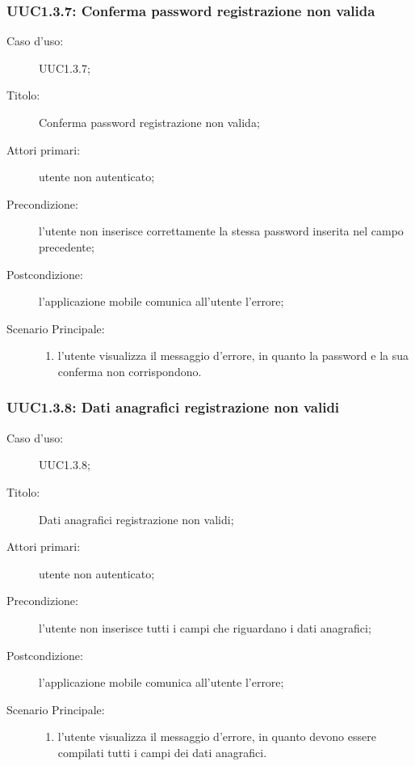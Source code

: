 \documentclass[../../../analisi-dei-requisiti.tex]{subfiles}
\begin{document}
\subsubsection{UUC1.3.7: Conferma password registrazione non valida}%
\label{subs:UUC1.3.7}
\begin{description}
  \item[Caso d'uso:] UUC1.3.7;
  \item[Titolo:] Conferma password registrazione non valida;
  \item[Attori primari:] utente non autenticato;
  \item[Precondizione:] l'utente non inserisce correttamente la stessa password inserita nel campo precedente;
  \item[Postcondizione:] l'applicazione mobile comunica all'utente l'errore;
  \item[Scenario Principale:]
        \begin{enumerate}
          \item l'utente visualizza il messaggio d'errore, in quanto la password e la sua conferma non corrispondono.
        \end{enumerate}
\end{description}

\subsubsection{UUC1.3.8: Dati anagrafici registrazione non validi}%
\label{subs:UUC1.3.8}
\begin{description}
  \item[Caso d'uso:] UUC1.3.8;
  \item[Titolo:] Dati anagrafici registrazione non validi;
  \item[Attori primari:] utente non autenticato;
  \item[Precondizione:] l'utente non inserisce tutti i campi che riguardano i dati anagrafici;
  \item[Postcondizione:] l'applicazione mobile comunica all'utente l'errore;
  \item[Scenario Principale:]
        \begin{enumerate}
          \item l'utente visualizza il messaggio d'errore, in quanto devono essere compilati tutti i campi dei dati anagrafici.
        \end{enumerate}
\end{description}
\end{document}
